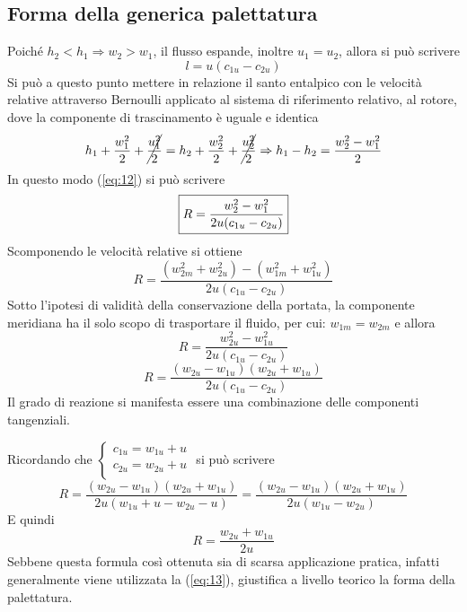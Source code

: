 \documentclass[a4paper, 15pt]{article}
\begin{document}
\subsection{Forma della generica palettatura}
\begin{adjustwidth}{2in}{}
	Poiché $h_2<h_1\Rightarrow w_2>w_1$, il flusso espande, inoltre $u_1=u_2$, allora si può scrivere
	\begin{equation}\label{eq:24}
		\boxed{l = u(c_{1u}-c_{2u})}
	\end{equation}
	Si può a questo punto mettere in relazione il santo entalpico con le velocità relative attraverso Bernoulli applicato al sistema di riferimento relativo, al rotore, dove la componente di trascinamento è uguale e identica
	\[h_1 + {w_1^2\over2} + \cancel{{u_1^2\over2}} = h_2 + {w_2^2\over2} + {\cancel{u_2^2\over2}} \Rightarrow h_1-h_2 = \dfrac{w_2^2-w_1^2}{2}  \]
	In questo modo (\ref{eq:12}) si può scrivere 
	\begin{equation}{\label{eq:13}}
		\boxed{R = \dfrac{w_2^2-w_1^2}{2u(c_{1u}-c_{2u})}}
	\end{equation}
	Scomponendo le velocità relative si ottiene 
	\[R = \dfrac{(w_{2m}^2 + w_{2u}^2) - (w_{1m}^2 + w_{1u}^2)}{2u(c_{1u}-c_{2u})}\]
	Sotto l'ipotesi di validità della conservazione della portata, la componente meridiana ha il solo scopo di trasportare il fluido, per cui: $w_{1m} = w_{2m}$ e allora 
	\[R = \dfrac {w_{2u}^2 - w_{1u}^2}{2u(c_{1u}-c_{2u})}\]
	\[R = \dfrac{(w_{2u}-w_{1u})(w_{2u}+w_{1u})}{2u(c_{1u}-c_{2u})}\]
	Il grado di reazione si manifesta essere una combinazione delle componenti tangenziali.
	
	Ricordando che \(\begin{cases}
		c_{1u} = w_{1u} + u\\
		c_{2u} = w_{2u} + u\\
	\end{cases}\) si può scrivere
	\[R = \dfrac{(w_{2u}-w_{1u})(w_{2u}+w_{1u})}{2u(w_{1u} + u -w_{2u} - u)} = \dfrac{(w_{2u}-w_{1u})(w_{2u}+w_{1u})}{2u(w_{1u} -w_{2u})}\]
	E quindi
	\[R = \dfrac{w_{2u}+w_{1u}}{2u}\]
	Sebbene questa formula così ottenuta sia di scarsa applicazione pratica, infatti generalmente viene utilizzata la (\ref{eq:13}), giustifica a livello teorico la forma della palettatura. 
	
	

\end{adjustwidth}
\end{document}
